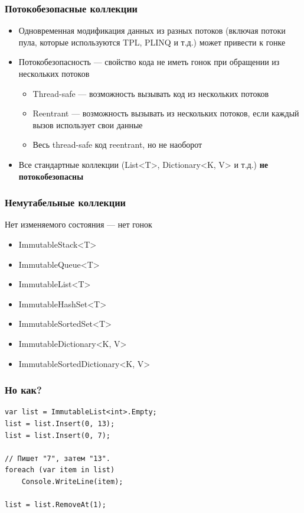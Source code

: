 \documentclass[xetex,mathserif,serif]{beamer}
\begin{document}
    \begin{frame}
        \frametitle{Потокобезопасные коллекции}
        \begin{itemize}
            \item Одновременная модификация данных из разных потоков (включая потоки пула, которые используются TPL, PLINQ и т.д.) может привести к гонке
            \item Потокобезопасность --- свойство кода не иметь гонок при обращении из нескольких потоков
            \begin{itemize}
                \item Thread-safe --- возможность вызывать код из нескольких потоков
                \item Reentrant --- возможность вызывать из нескольких потоков, если каждый вызов использует свои данные
                \item Весь thread-safe код reentrant, но не наоборот
            \end{itemize}
            \item Все стандартные коллекции (List<T>, Dictionary<K, V> и т.д.) \textbf{не потокобезопасны}
        \end{itemize}
    \end{frame}

    \begin{frame}
        \frametitle{Немутабельные коллекции}
        Нет изменяемого состояния --- нет гонок
        \begin{itemize}
            \item ImmutableStack<T>
            \item ImmutableQueue<T>
            \item ImmutableList<T>
            \item ImmutableHashSet<T>
            \item ImmutableSortedSet<T>
            \item ImmutableDictionary<K, V>
            \item ImmutableSortedDictionary<K, V>
        \end{itemize}
    \end{frame}

    \begin{frame}[fragile]
        \frametitle{Но как?}
        \begin{verbatim}
var list = ImmutableList<int>.Empty;
list = list.Insert(0, 13);
list = list.Insert(0, 7);

// Пишет "7", затем "13".
foreach (var item in list)
    Console.WriteLine(item);

list = list.RemoveAt(1);
        \end{verbatim}
    \end{frame}
\end{document}
